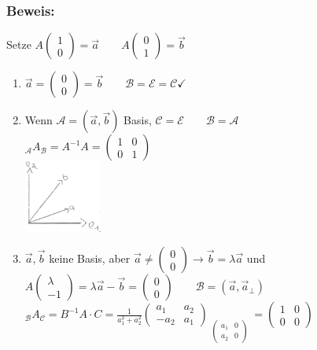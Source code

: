 \subsubsection{Beweis:}
Setze $A\begin{pmatrix} 1 \\ 0 \end{pmatrix} = \vec{a} \qquad A \begin{pmatrix} 0 \\ 1 \end{pmatrix} = \vec{b}$
\begin{enumerate}
	\item $\vec{a} = \begin{pmatrix} 0 \\ 0 \end{pmatrix} = \vec{b} \qquad \mathcal{B} = 
		\mathcal{E} = \mathcal{C} \checkmark$
	\item Wenn $\mathcal{A} = (\vec{a},\vec{b})$ Basis, $\mathcal{C}=\mathcal{E} \qquad 
		\mathcal{B}  = \mathcal{A}$ \\ 
		$_{\mathcal{A}}A_{\mathcal{B}}=A^{-1}A=\begin{pmatrix} 1 & 0 \\ 0 & 1 
		\end{pmatrix}$\\
		\includegraphics[width=0.2\textwidth]
	{mainmatter/chapter1/pics/grafik13.png}
	\item $\vec{a}, \vec{b}$ keine Basis, aber $\vec{a} \neq \begin{pmatrix} 0 \\ 0 
		\end{pmatrix} \rightarrow \vec{b} = \lambda \vec{a}$ und $A\begin{pmatrix}\lambda	
		\\ -1\end{pmatrix} = \lambda \vec{a} - \vec{b} = \begin{pmatrix} 0 \\ 0 
		\end{pmatrix} \qquad \mathcal{B} = (\vec{a},\vec{a}_{\perp})$\\
		$_{\mathcal{B}}A_{\mathcal{C}} = B^{-1}A\cdot C = \frac{1}{a_{1}^{2}+a_{2}^{2}} 
		\begin{pmatrix} a_{1} & a_{2} \\ -a_{2} & a_{1} \end{pmatrix} 
		\mathop{\underbrace{\begin{pmatrix} a_{1} & b_{1} \\ a_{2} & b_{2} 
		\end{pmatrix} \begin{pmatrix} 1 & \lambda \\ 0 & -1 
		\end{pmatrix}}}\limits_{\begin{pmatrix} a_{1} & 0 \\ a_{2} & 0 
		\end{pmatrix}}=\begin{pmatrix} 1 & 0 \\ 0 & 0 \end{pmatrix}$
\end{enumerate}